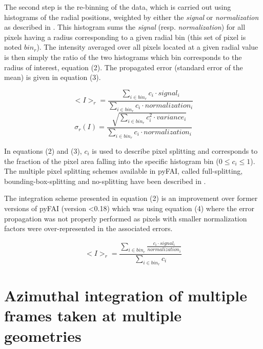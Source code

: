 \documentclass[preprint]{iucr}              %
\begin{document}
The second step is the re-binning of the data, which is carried out 
using histograms of the radial positions, 
weighted by either the \textit{signal} or \textit{normalization}
as described in .
This histogram sums the \textit{signal} (resp. \textit{normalization}) for all pixels
having a radius corresponding to a given radial bin (this set of pixel is noted $bin_r$).
The intensity averaged over all pixels located at a given radial value is then simply 
the ratio of the two histograms which bin corresponds to the radius of interest, equation (2). 
The propagated error (standard error of the mean) is given in equation (3).

\begin{equation}
<I>_{r} = \frac{\sum\limits_{i \in bin_r} c_i \cdot signal_i}
                        {\sum\limits_{i \in bin_r} c_i \cdot normalization_i} 
\end{equation}
\begin{equation}
\sigma_{r}(I) = \frac{\sqrt{\sum\limits_{i \in bin_r} c_i^2 \cdot variance_i}}
                  {\sum\limits_{i \in bin_r} c_i \cdot normalization_i} 
\end{equation}

In equations (2) and (3), $c_i$ is used to describe pixel splitting and 
corresponds to the fraction of the pixel area falling into the specific histogram bin 
($0\leq c_i \leq1$). 
The multiple pixel splitting schemes available in pyFAI, called full-splitting, 
bounding-box-splitting and no-splitting have been described in
.

The integration scheme presented in equation (2) is an improvement over 
former versions of pyFAI (version <0.18) which was using equation (4) where the error propagation 
was not properly performed as pixels with smaller normalization factors were  
over-represented in the associated errors.

\begin{equation}
<I>_{r} = \frac{\sum\limits_{i \in bin_r} \frac{ c_i \cdot
signal_i}{normalization_i}} {\sum\limits_{i \in bin_r} c_i} 
\end{equation}


\section{Azimuthal integration of multiple frames taken at multiple geometries}
\end{document}
